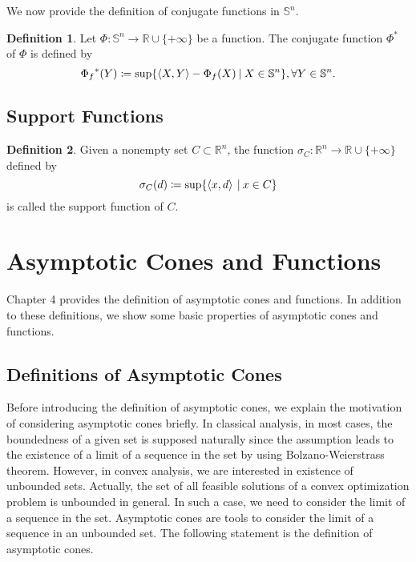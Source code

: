 \documentclass[a4paper,11pt, oneside]{book}
\theoremstyle{definition}
\newtheorem{dfn}{Definition}[section]
\newcommand{\RealNumberSet}{\mathbb{R}}
\newcommand{\NDemenstionalRealEuclideanSpace}{\mathbb{R}^n}
\newcommand{\NDemenstionalRealSymmetricMatrixSpace}{\mathbb{S}^n}
\newcommand{\InnerProduct}[2]{\left\langle {#1},{#2}\right\rangle} %
\newcommand{\ExtendedRealValuedFunction}[2]{{#1}: {#2} \to \RealNumberSet \cup \{+\infty\}}
\newcommand{\ConjugateFunction}[1]{{#1}^*}
\begin{document}
We now provide the definition of conjugate functions in $\NDemenstionalRealSymmetricMatrixSpace$.

\begin{dfn}
  Let $\ExtendedRealValuedFunction{\Phi}{\NDemenstionalRealSymmetricMatrixSpace}$ be a function. The conjugate function $\ConjugateFunction{\Phi}$ of $\Phi$ is defined by
  \begin{equation}
    {\Phi_{f}}^* (Y) \coloneqq \sup \{\InnerProduct{X}{Y} - \Phi_{f} (X) \:|\: X \in \NDemenstionalRealSymmetricMatrixSpace\}, \forall Y \in \NDemenstionalRealSymmetricMatrixSpace. \notag
  \end{equation}
\end{dfn}

\section{Support Functions}

\begin{dfn}
  Given a nonempty set $C \subset \NDemenstionalRealEuclideanSpace$, the function $\ExtendedRealValuedFunction{\sigma_C}{\NDemenstionalRealEuclideanSpace}$ defined by
  \begin{equation}
    \sigma_C (d) \coloneqq \sup\{\InnerProduct{x}{d} \:|\: x \in C\} \notag
  \end{equation}
  is called the support function of $C$.
\end{dfn}

\chapter{Asymptotic Cones and Functions}

Chapter 4 provides the definition of asymptotic cones and functions. In addition to these definitions, we show some basic properties of asymptotic cones and functions.

\section{Definitions of Asymptotic Cones}

Before introducing the definition of asymptotic cones, we explain the motivation of considering asymptotic cones briefly. In classical analysis, in most cases, the boundedness of a given set is supposed naturally since the assumption leads to the existence of a limit of a sequence in the set by using Bolzano-Weierstrass theorem. However, in convex analysis, we are interested in existence of unbounded sets. Actually, the set of all feasible solutions of a convex optimization problem is unbounded in general. In such a case, we need to consider the limit of a sequence in the set. Asymptotic cones are tools to consider the limit of a sequence in an unbounded set.
The following statement is the definition of asymptotic cones.
\end{document}
